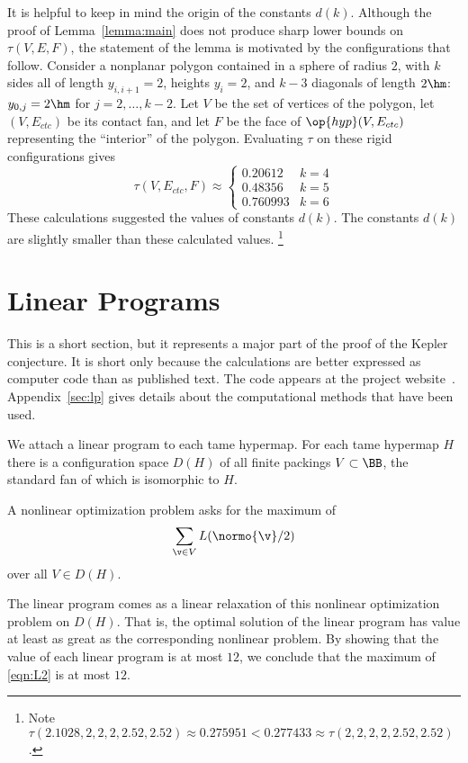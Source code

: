 \begin{remark}
  It is helpful to keep in mind the origin of the constants $d(k)$.
  Although the proof of Lemma~\ref{lemma:main} does not produce sharp
  lower bounds on $\tau(V,E,F)$, the statement of the lemma is
  motivated by the configurations that follow.  Consider a nonplanar
  polygon contained in a sphere of radius $2$, with $k$ sides all of
  length $y_{i,i+1}=2$, heights $y_i=2$, and $k-3$ diagonals of length
  $2\hm$: $y_{0,j}=2\hm$ for $j=2,\ldots,k-2$.  Let $V$ be the set of
  vertices of the polygon, let $(V,E_{ctc})$ be its contact fan, and
  let $F$ be the face of $\op{hyp}(V,E_{ctc})$ representing the
  ``interior'' of the polygon.  Evaluating $\tau$ on these rigid
  configurations gives
\[ 
\tau(V,E_{ctc},F) \approx
\begin{cases}
0.20612 & k=4\\
0.48356 & k=5\\
0.760993 &k=6
\end{cases}
\] 
These calculations suggested the values of constants $d(k)$.  The
constants $d(k)$ are slightly smaller than these calculated values.%
\footnote{Note $\tau(2.1028,2,2,2,2.52,2.52) \approx 0.275951 <
  0.277433 \approx \tau(2,2,2,2,2.52,2.52)$.}  %
%
%
\end{remark}


\section{Linear Programs}\label{sec:tsp}

This is a short section, but it represents a major part of the proof
of the Kepler conjecture.  It is short only because the calculations
are better expressed as computer code than as published text.  The
code appears at the project
website~\cite{website:FlyspeckProject}.  Appendix~\ref{sec:lp} gives
details about the computational methods that have been used.

We attach a linear program to each tame hypermap.  For each tame
hypermap $H$ there is a configuration space $D(H)$ of all finite
packings $V\subset \BB$,  the standard fan of which is isomorphic to $H$.
%
%

A nonlinear optimization problem asks for the maximum of
\begin{equation}\label{eqn:L2}
\sum_{\v\in V} L(\normo{\v}/2)
\end{equation}
over all $V\in D(H)$.

The linear program comes as a linear relaxation of this nonlinear
optimization problem on $D(H)$. That is, the optimal solution of the
linear program has value at least as great as the corresponding
nonlinear problem.  By showing that the value of each linear program
is at most $12$, we conclude that the maximum of \eqref{eqn:L2} is at
most $12$.




